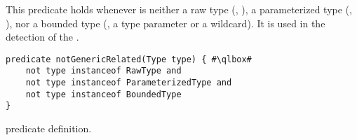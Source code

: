 This predicate holds whenever  is neither
a raw type (\eg{}, ),
a parameterized type (\eg{}, ), nor
a bounded type (\ie{}, a type parameter or a wildcard).
It is used in the detection of the .

\begin{listing}
\begin{verbatim}
predicate notGenericRelated(Type type) { #\qlbox#
	not type instanceof RawType and
	not type instanceof ParameterizedType and
	not type instanceof BoundedType
}
\end{verbatim}
\caption{ predicate definition.}
\label{lst:ql:notGenericRelated}
\end{listing}
